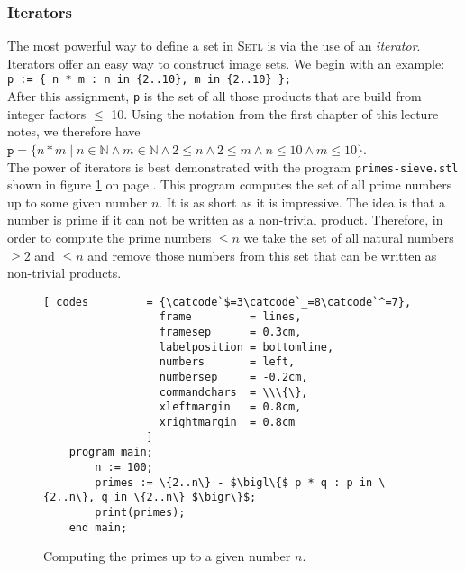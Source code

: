 \subsubsection{Iterators}
The most powerful way to define a set in \textsc{Setl} is via the use of an \emph{iterator}.
Iterators offer an easy way to construct image sets.  We begin with an example:
\\[0.2cm]
\hspace*{1.3cm} 
\texttt{p := \{ n * m : n in \{2..10\}, m in \{2..10\} \};} 
\\[0.2cm]
After this assignment,  \texttt{p} is the set of all those products that are build from
integer factors $\leq$ 10.  Using the notation from the first chapter of this lecture notes, we
therefore have 
\\[0.2cm]
\hspace*{1.3cm} 
$\mathtt{p} = \{ n * m \mid n \in \mathbb{N} \wedge m \in \mathbb{N} \wedge 2 \leq n
                \wedge 2 \leq m \wedge n \leq 10 \wedge m \leq 10 \}$. 
\\[0.2cm]
The power of iterators is best demonstrated with the program \texttt{primes-sieve.stl} shown in figure
 \ref{fig:primes-sieve.stl} on page \pageref{fig:primes-sieve.stl}.  
This program computes the set of all prime numbers up to some given number $n$.
It is as short as it is impressive.  The idea is that a number is prime if 
it can not be written as a non-trivial product.  Therefore, in order to compute the prime
numbers $\leq n$ we take the set of all natural numbers  $\geq 2$ and $\leq n$
and remove those numbers from this set that can be written as non-trivial products.


\begin{figure}[!ht]
  \centering
\begin{Verbatim}[ codes         = {\catcode`$=3\catcode`_=8\catcode`^=7},
                  frame         = lines, 
                  framesep      = 0.3cm, 
                  labelposition = bottomline,
                  numbers       = left,
                  numbersep     = -0.2cm,
                  commandchars  = \\\{\},
                  xleftmargin   = 0.8cm,
                  xrightmargin  = 0.8cm
                ]
    program main;
        n := 100;
        primes := \{2..n\} - $\bigl\{$ p * q : p in \{2..n\}, q in \{2..n\} $\bigr\}$;
        print(primes);
    end main;
\end{Verbatim} 
\vspace*{-0.3cm}
\caption{Computing the primes up to a given number $n$.}
  \label{fig:primes-sieve.stl}
\end{figure} %

